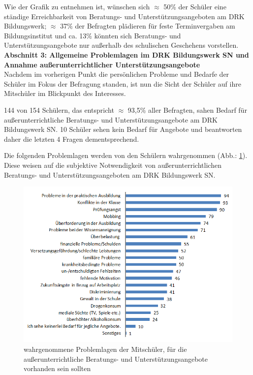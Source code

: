 \noindent
Wie der Grafik zu entnehmen ist, wünschen sich $\approx$ 50\% der Schüler eine ständige Erreichbarkeit von Beratungs- und Unterstützungsangeboten am DRK Bildungswerk; $\approx$ 37\% der Befragten plädieren für feste Terminvergaben am Bildungsinstitut und ca. 13\% könnten sich Beratungs- und Unterstützungsangebote nur außerhalb des schulischen Geschehens vorstellen.\\

\noindent
\textbf{Abschnitt 3: Allgemeine Problemlagen im DRK Bildungswerk SN und Annahme außerunterrichtlicher Unterstützungsangebote}\\

\noindent
Nachdem im vorherigen Punkt die persönlichen Probleme und Bedarfe der Schüler im Fokus der Befragung standen, ist nun die Sicht der Schüler auf ihre Mitschüler im Blickpunkt des Interesses.

144 von 154 Schülern, das entspricht $\approx$ 93,5\% aller Befragten, sahen Bedarf für außerunterrichtliche Beratungs- und Unterstützungsangebote am DRK Bildungswerk SN. 10 Schüler sehen kein Bedarf für Angebote und beantworten daher die letzten 4 Fragen dementsprechend.

Die folgenden Problemlagen werden von den Schülern wahrgenommen (Abb.: \ref{fig:Problemlagen-der-Mitschueler}). Diese weisen auf die subjektive Notwendigkeit von außerunterrichtlichen Beratungs- und Unterstützungsangeboten am DRK Bildungswerk SN.

\begin{figure}[ht]
	\centering
		\includegraphics[width=1.0\textwidth]{images/Problemlagen-der-Mitschueler.png}
	\caption{wahrgenommene Problemlagen der Mitschüler, für die außerunterrichtliche Beratungs- und Unterstützungsangebote vorhanden sein sollten}
	\label{fig:Problemlagen-der-Mitschueler}
\end{figure}

